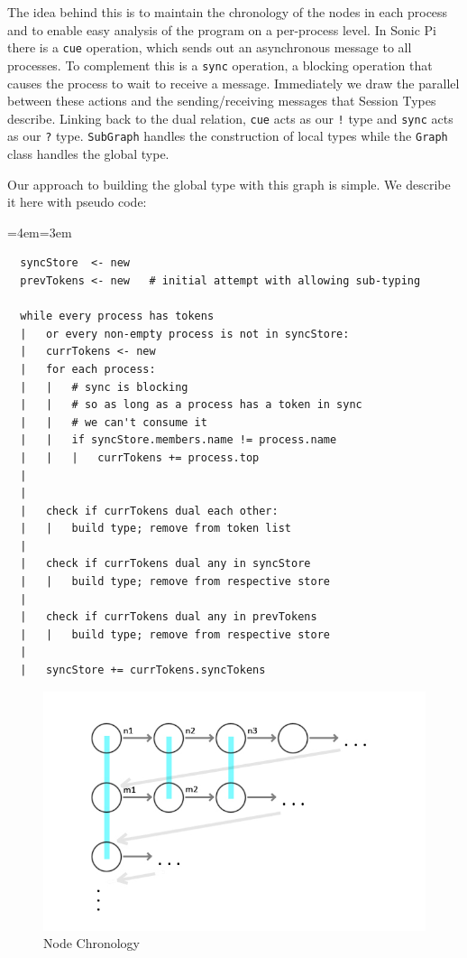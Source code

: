 \documentclass[11pt, abstracton, twoside, titlepage=true]{scrartcl}
\newenvironment{blockquote}{
	\par
	\medskip
	\leftskip=4em\rightskip=3em
	\noindent\ignorespaces
}{
	\par\medskip
}
\begin{document}
The idea behind this is to maintain the chronology of the nodes in each process and 
to enable easy analysis of the program on a per-process level. In Sonic Pi there is 
a \texttt{cue} operation, which sends out an asynchronous message to all processes. 
To complement this is a \texttt{sync} operation, a blocking operation that causes 
the process to wait to receive a message. Immediately we draw the parallel between 
these actions and the sending/receiving messages that Session Types describe. 
Linking back to the dual relation, \texttt{cue} acts as our \texttt{!} type and 
\texttt{sync} acts as our \texttt{?} type. \texttt{SubGraph} handles the construction 
of local types while the \texttt{Graph} class handles the global type.

Our approach to building the global type with this graph is simple. We describe it 
here with pseudo code:

\begin{blockquote}
	\begin{lstlisting}
  syncStore  <- new
  prevTokens <- new   # initial attempt with allowing sub-typing

  while every process has tokens
  |   or every non-empty process is not in syncStore:
  |   currTokens <- new
  |   for each process:
  |   |   # sync is blocking
  |   |   # so as long as a process has a token in sync
  |   |   # we can't consume it
  |   |   if syncStore.members.name != process.name
  |   |   |   currTokens += process.top
  |
  |
  |   check if currTokens dual each other:
  |   |   build type; remove from token list
  |	
  |   check if currTokens dual any in syncStore
  |   |   build type; remove from respective store
  |   
  |   check if currTokens dual any in prevTokens
  |   |   build type; remove from respective store
  |
  |   syncStore += currTokens.syncTokens
	\end{lstlisting}
\end{blockquote}

\begin{figure}[h!]
	\centering
	\includegraphics[width=\textwidth]{images/GraphOneFix.jpg}
	\caption{Node Chronology} \label{nodegraphone}
\end{figure}
\end{document}
